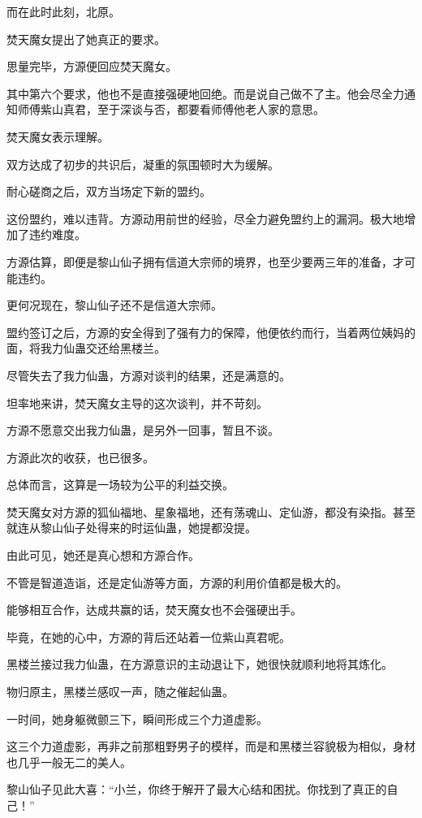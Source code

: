 \begin{this_body}
而在此时此刻，北原。

焚天魔女提出了她真正的要求。

思量完毕，方源便回应焚天魔女。

其中第六个要求，他也不是直接强硬地回绝。而是说自己做不了主。他会尽全力通知师傅紫山真君，至于深谈与否，都要看师傅他老人家的意思。

焚天魔女表示理解。

双方达成了初步的共识后，凝重的氛围顿时大为缓解。

耐心磋商之后，双方当场定下新的盟约。

这份盟约，难以违背。方源动用前世的经验，尽全力避免盟约上的漏洞。极大地增加了违约难度。

方源估算，即便是黎山仙子拥有信道大宗师的境界，也至少要两三年的准备，才可能违约。

更何况现在，黎山仙子还不是信道大宗师。

盟约签订之后，方源的安全得到了强有力的保障，他便依约而行，当着两位姨妈的面，将我力仙蛊交还给黑楼兰。

尽管失去了我力仙蛊，方源对谈判的结果，还是满意的。

坦率地来讲，焚天魔女主导的这次谈判，并不苛刻。

方源不愿意交出我力仙蛊，是另外一回事，暂且不谈。

方源此次的收获，也已很多。

总体而言，这算是一场较为公平的利益交换。

焚天魔女对方源的狐仙福地、星象福地，还有荡魂山、定仙游，都没有染指。甚至就连从黎山仙子处得来的时运仙蛊，她提都没提。

由此可见，她还是真心想和方源合作。

不管是智道造诣，还是定仙游等方面，方源的利用价值都是极大的。

能够相互合作，达成共赢的话，焚天魔女也不会强硬出手。

毕竟，在她的心中，方源的背后还站着一位紫山真君呢。

黑楼兰接过我力仙蛊，在方源意识的主动退让下，她很快就顺利地将其炼化。

物归原主，黑楼兰感叹一声，随之催起仙蛊。

一时间，她身躯微颤三下，瞬间形成三个力道虚影。

这三个力道虚影，再非之前那粗野男子的模样，而是和黑楼兰容貌极为相似，身材也几乎一般无二的美人。

黎山仙子见此大喜：“小兰，你终于解开了最大心结和困扰。你找到了真正的自己！”


\end{this_body}
